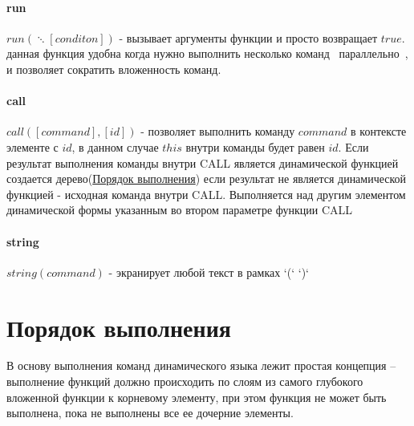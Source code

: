\documentclass[../index.tex]{subfiles}
\begin{document}
\label{p:run}
\paragraph{run}
$run(\ddots[conditon])$ - вызывает аргументы функции и просто возвращает $true$. данная функция 
удобна когда нужно выполнить несколько команд ~параллельно~, и позволяет сократить вложенность команд.

\label{p:call}
\paragraph{call}
$call([command], [id])$ - позволяет выполнить команду $command$ в контексте элементе с $id$, 
в данном случае $this$ внутри команды будет равен $id$. Если результат выполнения команды внутри CALL 
является динамической функцией создается дерево(\hyperref[sec:execrules]{Порядок выполнения}) 
если результат не является динамической функцией - исходная команда внутри CALL. 
Выполняется над другим элементом динамической формы указанным во втором параметре функции CALL 

\label{p:string}
\paragraph{string}
$string(command)$ - экранирует любой текст в рамках `(` `)`

\section{Порядок выполнения}\label{sec:execrules} 

В основу выполнения команд динамического языка лежит простая концепция -- выполнение функций должно происходить по слоям из самого глубокого вложенной функции к корневому элементу, при этом функция не может быть выполнена, пока не выполнены все ее дочерние элементы.
\end{document}
